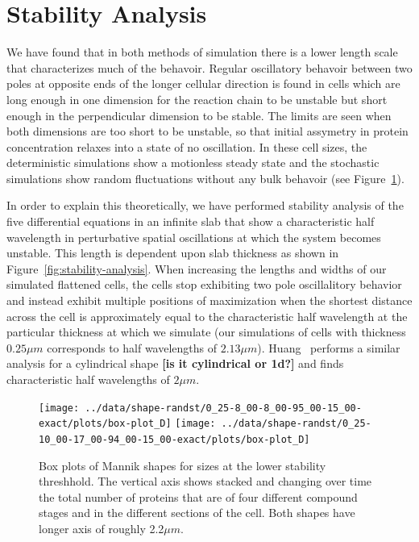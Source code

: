 \documentclass[letterpaper,twocolumn,amsmath,amssymb,pre]{revtex4-1}
\newcommand{\red}[1]{{\bf \color{red} #1}}
\newcommand{\fixme}[1]{\red{[#1]}}
\begin{document}
\section{Stability Analysis}
\label{sec:stability-analysis}
We have found that in both methods of simulation there is a lower
length scale that characterizes much of the behavoir.  Regular
oscillatory behavoir between two poles at opposite ends of the longer
cellular direction is found in cells which are long enough in one
dimension for the reaction chain to be unstable but short enough in
the perpendicular dimension to be stable.  The limits are seen when
both dimensions are too short to be unstable, so that initial
assymetry in protein concentration relaxes into a state of no
oscillation.  In these cell sizes, the deterministic simulations show
a motionless steady state and the stochastic simulations show random
fluctuations without any bulk behavoir (see Figure~\ref{box-mannik}).

In order to explain this theoretically, we have performed stability
analysis of the five differential equations in an infinite slab that
show a characteristic half wavelength in perturbative spatial
oscillations at which the system becomes unstable.  This length is
dependent upon slab thickness as shown in
Figure~\ref{fig:stability-analysis}.  When increasing the lengths and
widths of our simulated flattened cells, the cells stop exhibiting two
pole oscillalitory behavior and instead exhibit multiple positions of
maximization when the shortest distance across the cell is
approximately equal to the characteristic half wavelength at the
particular thickness at which we simulate (our simulations of cells
with thickness $0.25\mu m$ corresponds to half wavelengths of $2.13\mu
m$).  Huang~\cite{huang2003dynamic} performs a similar analysis for a
cylindrical shape \fixme{is it cylindrical or 1d?} and finds
characteristic half wavelengths of $2\mu m$.

\begin{figure}
  \texttt{[image: ../data/shape-randst/0\_25-8\_00-8\_00-95\_00-15\_00-exact/plots/box-plot\_D]}
  \texttt{[image: ../data/shape-randst/0\_25-10\_00-17\_00-94\_00-15\_00-exact/plots/box-plot\_D]}
  \caption{Box plots of Mannik shapes for sizes at the lower stability
    threshhold.  The vertical axis shows stacked and changing over
    time the total number of proteins that are of four different
    compound stages and in the different sections of the cell.  Both
    shapes have longer axis of roughly 2.2$\mu m$.}
  \label{box-mannik}
\end{figure}
\end{document}
